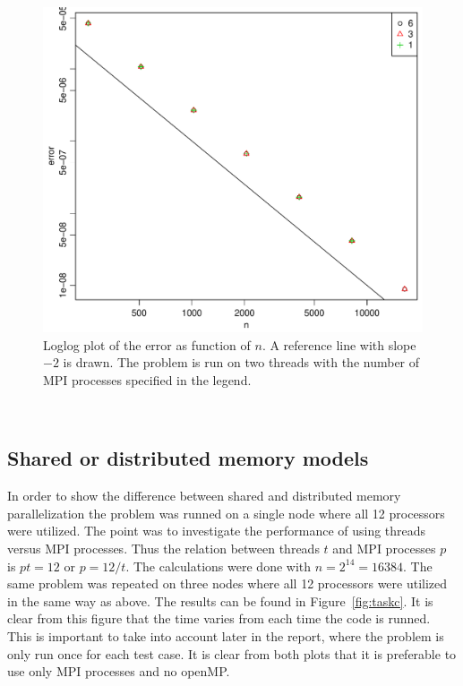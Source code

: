 \begin{figure}[h!]
\begin{center}
    \includegraphics[scale=0.4]{./Figures/errVsn.pdf}
\end{center}
  \vspace{-1\baselineskip}
\caption{Loglog plot of the error as function of $n$. A reference line with slope $-2$ is drawn. The problem is run on two threads with the number of MPI processes specified in the legend.}
\label{fig:errVsn}
\end{figure}
%
\\
\subsection{Shared or distributed memory models}
In order to show the difference between shared and distributed memory parallelization the problem was runned on a single node where all 12 processors were utilized. The point was to investigate the performance of using threads versus MPI processes. Thus the relation between threads $t$ and MPI processes $p$ is $p t = 12$ or $p = 12/t$. The calculations were done with $n = 2^{14} = 16384$. 
The same problem was repeated on three nodes where all 12 processors were utilized in the same way as above. The results can be found in Figure~\ref{fig:taskc}. It is clear from this figure that the time varies from each time the code is runned. This is important to take into account later in the report, where the problem is only run once for each test case. It is clear from both plots that it is preferable to use only MPI processes and no openMP. 

